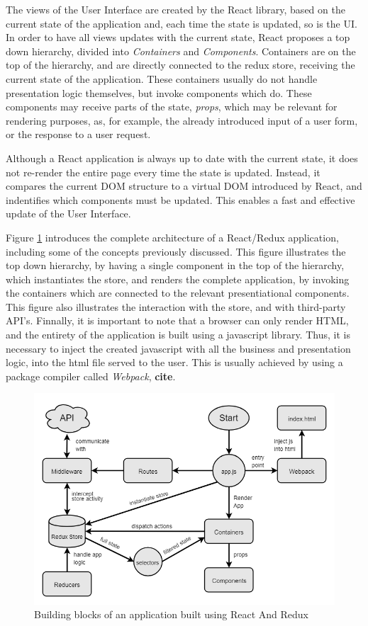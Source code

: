 The views of the User Interface are created by the React library,
based on the current state of the application and, each time the state is updated,
so is the UI. In order to have all views updates with the current state,
React proposes a top down hierarchy, divided into \textit{Containers} and \textit{Components}.
Containers are on the top of the hierarchy, and are directly connected to the redux store,
receiving the current state of the application. These containers usually
do not handle presentation logic themselves, but invoke components which do.
These components may receive parts of the state, \textit{props}, which may be relevant for rendering purposes,
as, for example, the already introduced input of a user form, or the response to a user request.

Although a React application is always up to date with the current state,
it does not re-render the entire page every time the state is updated. 
Instead, it compares the current DOM structure to a virtual DOM introduced by React,
and indentifies which components must be updated. This enables a fast and effective 
update of the User Interface.

Figure \ref{fig:react_redux_app} introduces the complete architecture of a React/Redux application, 
including some of the concepts previously discussed.
This figure illustrates the top down hierarchy, by having a single component in the top of the hierarchy,
which instantiates the store, and renders the complete application, by invoking the containers 
which are connected to the relevant presentiational components.
This figure also illustrates the interaction with the store, and with third-party API's.
Finnally, it is important to note that a browser can only render HTML,
and the entirety of the application is built using a javascript library. Thus, it is necessary 
to inject the created javascript with all the business and presentation logic, into the html file served 
to the user. This is usually achieved by using a package compiler called \textit{Webpack}, \textbf{cite}.

\begin{figure}[htpb]
  \centering
  \includegraphics[width=\textwidth]{./Figures/system_implementation/react_redux_app.png}
  \caption{Building blocks of an application built using React And Redux}
  \label{fig:react_redux_app}  
\end{figure}




